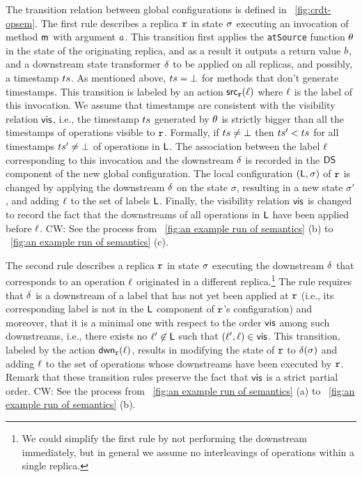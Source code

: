 The transition relation between global configurations is defined in
\figurename~\ref{fig:crdt-opsem}.
The first rule describes a replica $\mathtt{r}$ in state $\sigma$
executing an invocation of method $\mathsf{m}$ with argument $a$.
This transition first applies the {\tt atSource} function $\theta$
in the state of the originating replica, and as a result it outputs a
return value $b$, and a downstream state transformer $\delta$
to be applied on all replicas, and possibly, a timestamp $ts$.
As mentioned above, $ts=\bot$ for methods that don't generate
timestamps. This transition is labeled by an action $\mathsf{src}_{\mathtt{r}}(\ell)$ where
$\ell$ is the label of this invocation.
We assume that timestamps are consistent with the visibility relation
$\mathsf{vis}$, i.e., the timestamp $ts$ generated by $\theta$ is strictly bigger than
all the timestamps of operations visible to $\mathtt{r}$. Formally, if $ts\neq\bot$ then $ts' < ts$ for all timestamps
$ts'\neq\bot$ of operations in $\mathsf{L}$.
The association between the label $\ell$ corresponding to this
invocation and the downstream $\delta$ is recorded in the
$\mathsf{DS}$ component of the new global configuration.
The local configuration $(\mathsf{L},\sigma)$ of $\mathtt{r}$ is changed by
applying the downstream $\delta$ on the state $\sigma$, resulting
in a new state $\sigma'$, and adding $\ell$ to the set of labels
$\mathsf{L}$.
Finally, the visibility relation $\mathsf{vis}$ is changed to record the
fact that the downstreams of all operations in $\mathsf{L}$ have been
applied before $\ell$.
 {\color {red} CW: See the process from \figurename~\ref{fig:an example run of semantics} (b) to \figurename~\ref{fig:an example run of semantics} (c).}

The second rule describes a replica $\mathtt{r}$ in state $\sigma$
executing the downstream $\delta$ that corresponds to an operation
$\ell$ originated in a different replica.\footnote{We could
  simplify the first rule by not performing the downstream immediately,
  but in general we assume no interleavings of operations within a
  single replica.}
The rule requires that $\delta$ is a downstream of a label that has
not yet been applied at $\mathtt{r}$ (i.e., its corresponding label is not
in the $\mathsf{L}$ component of $\mathtt{r}$'s configuration) and
moreover, that it is a minimal one with respect to the order
$\mathsf{vis}$ among such downstreams, i.e., there exists no
$\ell'\not\in \mathsf{L}$ such that $(\ell',\ell)\in
\mathsf{vis}$.
This transition, labeled by the action $\mathsf{dwn}_{\mathtt{r}}(\ell)$, results in modifying the state of $\mathtt{r}$ to
$\delta(\sigma)$ and adding $\ell$ to the set of operations
whose downstreams have been executed by $\mathtt{r}$.
Remark that these transition rules preserve the fact that $\mathsf{vis}$ is
a strict partial order.
 {\color {red} CW: See the process from \figurename~\ref{fig:an example run of semantics} (a) to \figurename~\ref{fig:an example run of semantics} (b).}

